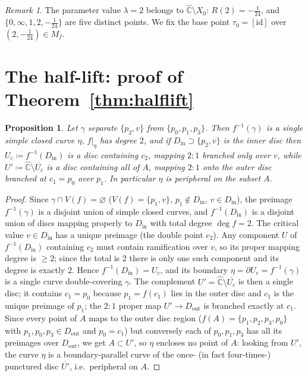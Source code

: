 \documentclass[11pt]{article}
\newtheorem{proposition}[theorem]{Proposition}
\theoremstyle{definition}
\theoremstyle{remark}
\newtheorem{remark}[theorem]{Remark}
\newcommand{\Chat}{\widehat{\mathbb C}}
\begin{document}

\begin{remark}\label{rem:param2}
The parameter value $\lambda=2$ belongs to
$\Chat\setminus X_0$: $R(2)=-\tfrac1{24}$, and
$\{0,\infty,1,2,-\tfrac1{24}\}$ are five distinct points.  We fix the
base point $\tau_0=[\mathrm{id}]$ over $(2,-\tfrac1{24})\in M_f$.
\end{remark}

\section{The half-lift: proof of Theorem~\ref{thm:halflift}}\label{sec:halflift}

\begin{proposition}\label{prop:preimage}
Let $\gamma$ separate $\{p_2,v\}$ from $\{p_0,p_1,p_3\}$.  Then
$f^{-1}(\gamma)$ is a single simple closed curve $\eta$, $f|_\eta$ has
degree $2$, and if $D_{\mathrm{in}}\supset\{p_2,v\}$ is the inner disc
then $U_c\coloneqq f^{-1}(D_{\mathrm{in}})$ is a disc containing
$c_2$, mapping $2:1$ branched only over $v$, while
$U'\coloneqq\Chat\setminus\overline{U_c}$ is a disc containing all of
$A$, mapping $2:1$ onto the outer disc branched at $c_1=p_0$ over
$p_1$.  In particular $\eta$ is peripheral on the subset $A$.
\end{proposition}

\begin{proof}
Since $\gamma\cap V(f)=\varnothing$ ($V(f)=\{p_1,v\}$,
$p_1\notin D_{\mathrm{in}}$, $v\in D_{\mathrm{in}}$), the preimage
$f^{-1}(\gamma)$ is a disjoint union of simple closed curves, and
$f^{-1}(D_{\mathrm{in}})$ is a disjoint union of discs mapping
properly to $D_{\mathrm{in}}$ with total degree $\deg f=2$.  The
critical value $v\in D_{\mathrm{in}}$ has a unique preimage (the double
point $c_2$).  Any component $U$ of $f^{-1}(D_{\mathrm{in}})$
containing $c_2$ must contain ramification over $v$, so its proper
mapping degree is $\ge2$; since the total is $2$ there is only one such
component and its degree is exactly $2$.  Hence
$f^{-1}(D_{\mathrm{in}})=U_c$, and its boundary
$\eta=\partial U_c=f^{-1}(\gamma)$ is a single curve double-covering
$\gamma$.  The complement $U'=\Chat\setminus\overline{U_c}$ is then a
single disc; it contains $c_1=p_0$ because $p_1=f(c_1)$ lies in the
outer disc and $c_1$ is the unique preimage of $p_1$; the $2:1$ proper
map $U'\to D_{\mathrm{out}}$ is branched exactly at $c_1$.  Since every
point of $A$ maps to the outer disc region ($f(A)=\{p_1,p_2,p_3,p_0\}$
with $p_1,p_0,p_3\in D_{\mathrm{out}}$ and $p_0=c_1$) but conversely
each of $p_0,p_1,p_3$ has all its preimages over $D_{\mathrm{out}}$,
we get $A\subset U'$, so $\eta$ encloses no point of $A$: looking from
$U'$, the curve $\eta$ is a boundary-parallel curve of the once- (in
fact four-times-) punctured disc $\overline{U'}$, i.e.\ peripheral on
$A$.
\end{proof}
\end{document}

